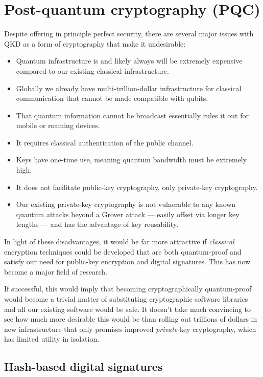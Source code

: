 \section{Post-quantum cryptography (PQC)} \label{post-quantum-cryptography-pqc}

Despite offering in principle perfect security, there are several major issues with QKD as a form of cryptography that make it undesirable:
\begin{itemize}
	\item Quantum infrastructure is and likely always will be extremely expensive compared to our existing classical infrastructure.
	\item Globally we already have multi-trillion-dollar infrastructure for classical communication that cannot be made compatible with qubits.
	\item That quantum information cannot be broadcast essentially rules it out for mobile or roaming devices.
	\item It requires classical authentication of the public channel.
	\item Keys have one-time use, meaning quantum bandwidth must be extremely high.
	\item It does not facilitate public-key cryptography, only private-key cryptography.
	\item Our existing private-key cryptography is not vulnerable to any known quantum attacks beyond a Grover attack --- easily offset via longer key lengths --- and has the advantage of key reusability.
\end{itemize}

In light of these disadvantages, it would be far more attractive if \emph{classical} encryption techniques could be developed that are both quantum-proof and satisfy our need for public-key encryption and digital signatures. This has now become a major field of research.

If successful, this would imply that becoming cryptographically quantum-proof would become a trivial matter of substituting cryptographic software libraries and all our existing software would be safe. It doesn't take much convincing to see how much more desirable this would be than rolling out trillions of dollars in new infrastructure that only promises improved \emph{private}-key cryptography, which has limited utility in isolation.

\subsection{Hash-based digital signatures} \label{hash-based-digital-signatures}

